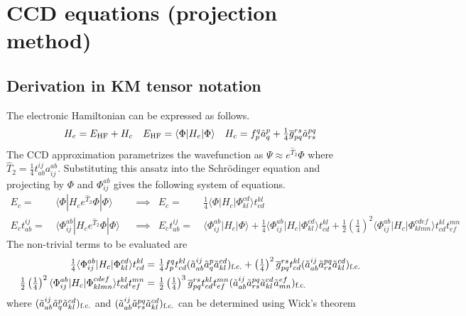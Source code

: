 \documentclass[11pt,fleqn]{article}
\newcommand{\F}{\Phi}        %
\newcommand{\Y}{\Psi}        %
\newcommand{\tl}{\ensuremath{\tilde}}
\newcommand{\ol}[1]{\ensuremath{\overline{#1}}}
\newcommand{\op}[1]{\ensuremath{\hat{#1}}}
\newcommand{\pr}[1]{\ensuremath{\left(#1\right)}}
\newcommand{\ip}[1]{\ensuremath{\langle#1\rangle}}
\theoremstyle{mystyle}
\begin{document}
\section*{CCD equations (projection method)}

\subsection*{Derivation in KM tensor notation}

The electronic Hamiltonian can be expressed as follows.
\begin{align}
&&
  H_e
=
  E_{\text{HF}}
+
  H_c
&&
  E_{\text{HF}}
=
  \ip{\F|H_e|\F}
&&
  H_c
=
  f_p^q
  \tl{a}_q^p
+
  \tfrac{1}{4}
  \ol{g}_{pq}^{rs}
  \tl{a}_{rs}^{pq}
\end{align}
The CCD approximation parametrizes the wavefunction as $\Y\approx e^{\op{T}_2}\F$ where $\op{T}_2=\tfrac{1}{4}t_{ab}^{ij}a_{ij}^{ab}$.
Substituting this ansatz into the Schr\"odinger equation and projecting by $\F$ and $\F_{ij}^{ab}$ gives the following system of equations.
\begin{align}
\label{ccd-energy-equation}
  E_c
=&\
  \ip{\F|H_ce^{\op{T}_2}\F|\F}
&&
  \implies
&
  E_c
=&\
  \tfrac{1}{4}
  \ip{\F|H_c|\F_{kl}^{cd}}t_{cd}^{kl}
\\
\label{ccd-t2-amplitude-equation}
  E_ct_{ab}^{ij}
=&\
  \ip{\F_{ij}^{ab}|H_ce^{\op{T}_2}\F|\F}
&&
  \implies
&
  E_ct_{ab}^{ij}
=&\
  \ip{\F_{ij}^{ab}|H_c|\F}
+
  \tfrac{1}{4}
  \ip{\F_{ij}^{ab}|H_c|\F_{kl}^{cd}}t_{cd}^{kl}
+
  \tfrac{1}{2}
  \pr{\tfrac{1}{4}}^2
  \ip{\F_{ij}^{ab}|H_c|\F_{klmn}^{cdef}}t_{cd}^{kl}t_{ef}^{mn}
\end{align}
The non-trivial terms to be evaluated are
\begin{align}
\label{ccd-matrix-elements}
&&
  \tfrac{1}{4}
  \ip{\F_{ij}^{ab}|H_c|\F_{kl}^{cd}}t_{cd}^{kl}
=&\
  \tfrac{1}{4}
  f_p^q
  t_{cd}^{kl}
  (\tl{a}_{ab}^{ij}\tl{a}_q^p\tl{a}_{kl}^{cd})_{\text{f.c.}}
+
  \pr{\tfrac{1}{4}}^2
  \ol{g}_{pq}^{rs}
  t_{cd}^{kl}
  (\tl{a}_{ab}^{ij}\tl{a}_{rs}^{pq}\tl{a}_{kl}^{cd})_{\text{f.c.}}
\\&&
  \tfrac{1}{2}
  \pr{\tfrac{1}{4}}^2
  \ip{\F_{ij}^{ab}|H_c|\F_{klmn}^{cdef}}
  t_{cd}^{kl}t_{ef}^{mn}
=&\
  \tfrac{1}{2}
  \pr{\tfrac{1}{4}}^3
  \ol{g}_{pq}^{rs}
  t_{cd}^{kl}t_{ef}^{mn}
  (\tl{a}_{ab}^{ij}\tl{a}_{rs}^{pq}\tl{a}_{kl}^{cd}\tl{a}_{mn}^{ef})_{\text{f.c.}}
\end{align}
where $(\tl{a}_{ab}^{ij}\tl{a}_q^p\tl{a}_{kl}^{cd})_{\text{f.c.}}$ and $(\tl{a}_{ab}^{ij}\tl{a}_{rs}^{pq}\tl{a}_{kl}^{cd})_{\text{f.c.}}$ can be determined using Wick's theorem
\end{document}
